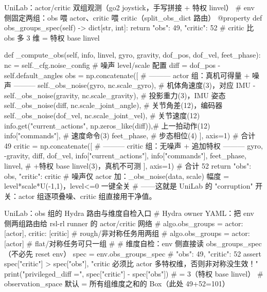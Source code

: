 \begin{codebox}[Python]{UniLab：actor/critic 双组观测（go2 joystick，手写拼接 + 特权 linvel）}
# env 侧固定两组：obs 喂 actor、critic 喂 critic（split_obs_dict 路由）
@property
def obs_groups_spec(self) -> dict[str, int]:
    return {"obs": 49, "critic": 52}          # critic 比 obs 多 3 维 = 特权 base linvel

def _compute_obs(self, info, linvel, gyro, gravity, dof_pos, dof_vel, feet_phase):
    nc   = self._cfg.noise_config              # 噪声 level/scale 配置
    diff = dof_pos - self.default_angles
    obs = np.concatenate([                     # ——— actor 组：真机可得量 + 噪声 ———
        self._obs_noise(gyro,    nc.scale_gyro),         # 机体角速度(3)，对应 IMU
        -self._obs_noise(gravity, nc.scale_gravity),     # 投影重力(3)，IMU 姿态
        self._obs_noise(diff,    nc.scale_joint_angle),  # 关节角差(12)，编码器
        self._obs_noise(dof_vel, nc.scale_joint_vel),    # 关节速度(12)
        info.get("current_actions", np.zeros_like(diff)),# 上一拍动作(12)
        info["commands"],                                # 速度命令(3)
        feet_phase,                                      # 步态相位(4)
    ], axis=1)                                           # 合计 49
    critic = np.concatenate([                  # ——— critic 组：无噪声 + 追加特权 ———
        gyro, -gravity, diff, dof_vel, info["current_actions"],
        info["commands"], feet_phase,
        linvel,                                          # +特权 base linvel(3)，真机不可测
    ], axis=1)                                           # 合计 52
    return {"obs": obs, "critic": critic}
# 噪声仅 actor 加：_obs_noise(data, scale) 幅度 = level*scale*U(-1,1)，level<=0 一键全关
#   ——这就是 UniLab 的 "corruption" 开关：actor 组逐项叠噪、critic 组直接用干净值。
\end{codebox}

\begin{codebox}[Python]{UniLab：obs 组的 Hydra 路由与维度自检入口}
# Hydra owner YAML：把 env 侧两组路由给 rsl-rl runner 的 actor/critic 网络
# algo.obs_groups = {actor: [actor], critic: [critic]}   # rough/非对称任务用两组
# algo.obs_groups = {actor: [actor]}                     # flat/对称任务可只一组
#
# 维度自检：env 侧直接读 obs_groups_spec（不必先 reset env）
spec = env.obs_groups_spec                  # {"obs": 49, "critic": 52}
assert spec["critic"] > spec["obs"], "critic 必须比 actor 多特权维，否则非对称没生效！"
print("privileged_diff =", spec["critic"] - spec["obs"])   # = 3（特权 base linvel）
# observation_space 默认 = 所有组维度之和的 Box（此处 49+52=101）
\end{codebox}

